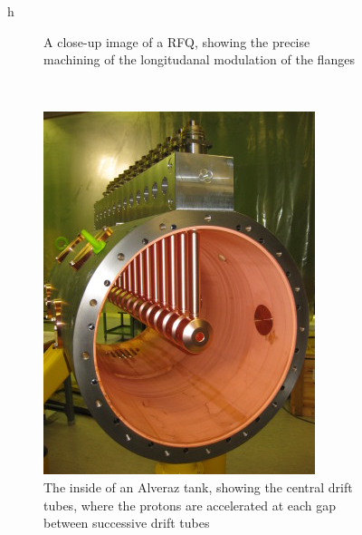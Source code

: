 \begin{figure}{h}
\begin{subfigure}[h]{0.4\textwidth}
        \caption{A close-up image of a RFQ, showing the precise
          machining of the longitudanal modulation of the flanges}\label{fig:rfq_actual}
      \end{subfigure}
      ~ %
      \begin{subfigure}[h]{0.4\textwidth}
        \includegraphics[width=\textwidth]{Figures/LHC_Diagrams/LHC__Linac2__AlvarezTube_Inside__DTL_proto_assembled_image.jpg}
        \caption{The inside of an Alveraz tank, showing the central
          drift tubes, where the protons are accelerated at each gap
          between successive drift tubes}\label{fig:alvarez_tank_inside}
      \end{subfigure}
      ~ %
      \begin{subfigure}[h]{0.4\textwidth}

\end{subfigure}
\end{figure}
